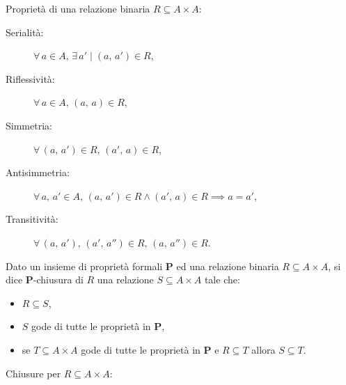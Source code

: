 \documentclass[10pt]{article}
\begin{document}
        Proprietà di una relazione binaria \(R \subseteq A \times A\):

        \medskip

        \begin{minipage}[h]{.4\textwidth}
            \begin{description}
                \item[Serialità:] \(\forall \, a \in A, \, \exists \, a' \; | \; (a, \, a') \in R\),
                \item[Riflessività:] \(\forall \, a \in A, \, (a, \, a) \in R\),
                \item[Simmetria:] \(\forall \, (a, \, a') \in R, \, (a', \, a) \in R\),
            \end{description}
        \end{minipage}
        \begin{minipage}[h]{.6\textwidth}
            \begin{description}
                \item[Antisimmetria:] \(\forall \, a, \, a' \in A, \, (a, \, a') \in R \land (a', \, a) \in R \implies a = a'\),
                \item[Transitività:] \(\forall \, (a, \, a'), \, (a', \, a'') \in R, \, (a, \, a'') \in R\).
            \end{description}
        \end{minipage}

        \medskip

        Dato un insieme di proprietà formali \textbf{P} ed una relazione binaria \(R \subseteq A \times A\), si dice \textbf{P}-chiusura
        di \(R\) una relazione \(S \subseteq A \times A\) tale che:
        \begin{itemize}
            \item \(R \subseteq S\),
            \item \(S\) gode di tutte le proprietà in \textbf{P},
            \item se \(T \subseteq A \times A\) gode di tutte le proprietà in \textbf{P} e \(R \subseteq T\) allora \(S \subseteq T\).
        \end{itemize}
        
        Chiusure per \(R \subseteq A \times A\):

        \medskip
\end{document}
